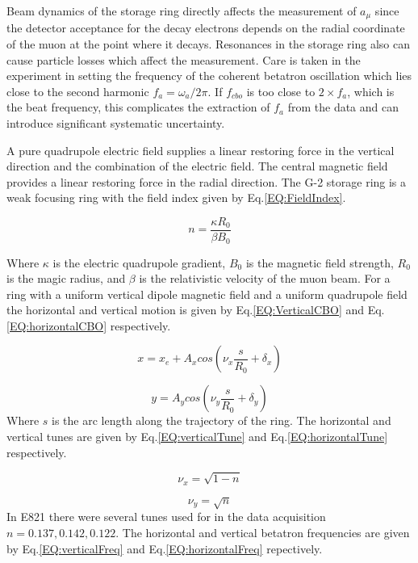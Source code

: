 \documentclass[./Thesis]{subfiles}
\begin{document}
	Beam dynamics of the storage ring directly affects the measurement of $a_\mu$ since the detector acceptance for the decay electrons depends on the radial coordinate of the muon at the point where it decays.  Resonances in the storage ring also can cause particle losses which affect the measurement.  Care is taken in the experiment in setting the frequency of the coherent betatron oscillation which lies close to the second harmonic $f_a = \omega_a / 2\pi$.  If $f_{cbo}$ is too close to $2\times f_a$, which is the beat frequency, this complicates the extraction of $f_a$ from the data and can introduce significant systematic uncertainty.  

	A pure quadrupole electric field supplies a linear restoring force in the vertical direction and the combination of the electric field.  The central magnetic field provides a linear restoring force in the radial direction. The G-2 storage ring is a weak focusing ring with the field index given by Eq.\ref{EQ:FieldIndex}.

	\begin{equation}\label{EQ:FieldIndex}
	n =\frac{\kappa R_0}{\beta B_0}
	\end{equation}

	Where $\kappa$ is the electric quadrupole gradient, $B_0$ is the magnetic field strength, $R_0$ is the magic radius, and $\beta$ is the relativistic velocity of the muon beam.  For a ring with a uniform vertical dipole magnetic field and a uniform quadrupole field the horizontal and vertical motion is given by Eq.\ref{EQ:VerticalCBO} and Eq.\ref{EQ:horizontalCBO} respectively.
	
	\begin{equation}
	\label{EQ:VerticalCBO}
	x = x_e +A_x cos(\nu_x \frac{s}{R_0} + \delta_x)
	\end{equation}

	\begin{equation}
	\label{EQ:horizontalCBO}
	y =  A_y cos(\nu_y \frac{s}{R_0} + \delta_y)
	\end{equation}
Where $s$ is the arc length along the trajectory of the ring. The horizontal and vertical tunes are given by Eq.\ref{EQ:verticalTune} and  Eq.\ref{EQ:horizontalTune} respectively.

	\begin{equation}
	\label{EQ:verticalTune}
	\nu_x = \sqrt{1-n}
	\end{equation}

	\begin{equation}
	\label{EQ:horizontalTune}
	\nu_y = \sqrt{n}
	\end{equation}
In E821 there were several tunes used for in the data acquisition $n = 0.137, 0.142, 0.122$. The horizontal and vertical betatron frequencies are given by Eq.\ref{EQ:verticalFreq}  and  Eq.\ref{EQ:horizontalFreq} repectively.
\end{document}
